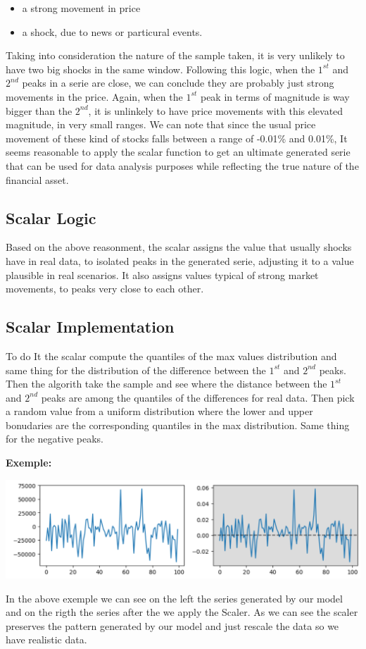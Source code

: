 \documentclass{article}
\begin{document}
\begin{multicols}{2}
    \begin{itemize}
        \item a strong movement in price
        \item a shock, due to news or particural events.
    \end{itemize}  
    Taking into consideration the nature of the sample taken, it is very unlikely to have two big shocks in the same window. Following this logic, when the $1^{st}$ and $2^{nd}$ peaks in a serie are close, we can conclude they are probably just strong movements in the price. Again, when the $1^{st}$ peak in terms of magnitude is way bigger than the $2^{nd}$, it is unlinkely to have price movements with this elevated magnitude, in very small ranges. We can note that since the usual price movement of these kind of stocks falls between a range of -0.01\% and 0.01\%, It seems reasonable to apply the scalar function to get an ultimate generated serie that can be used for data analysis purposes while reflecting the true nature of the financial asset. 
    \subsection*{Scalar Logic}
    Based on the above reasonment, the scalar assigns the value that usually shocks have in real data, to isolated peaks in the generated serie, adjusting it to a value plausible in real scenarios.
    It also assigns values typical of strong market movements, to peaks very close to each other.
    \subsection*{Scalar Implementation}
    To do It the scalar compute the quantiles of the max values distribution and same thing for the distribution of the difference between the $1^{st}$ and 
    $2^{nd}$ peaks.\\
    Then the algorith take the sample and see where the distance between the $1^{st}$ and $2^{nd}$ peaks are among the quantiles of the differences for real 
    data. Then pick a random value from a uniform distribution where the lower and upper bonudaries are the corresponding quantiles in the max distribution. 
    Same thing for the negative peaks.
    \end{multicols}
    \textbf{Exemple:}
    \begin{center}
        \includegraphics[scale=0.6]{imgs/EX_03.png}
    \end{center}
    In the above exemple we can see on the left the series generated by our model and on the rigth the series after the we apply the Scaler. As we can see 
    the scaler preserves the pattern generated by our model and just rescale the data so we have realistic data.
\end{document}
